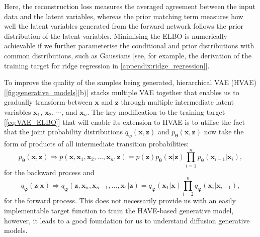 Here, the reconstruction loss measures the averaged agreement between the input data and the latent variables, whereas the prior matching term measures how well the latent variables generated from the forward network follows the prior distribution of the latent variables. Minimising the ELBO is numerically achievable if we further parameterise the conditional and prior distributions with common distributions, such as Gaussians [see, for example, the derivation of the training target for ridge regression in \cref{appendix:ridge_regression}]. 

To improve the quality of the samples being generated, hierarchical VAE (HVAE) [\cref{fig:generative_models}(b)] stacks multiple VAE together that enables us to gradually transform between $\bm{x}$ and $\bm{z}$ through multiple intermediate latent variables $\bm{x}_1$, $\bm{x}_2$, $\cdots$, and $\bm{x}_n$. The key modification to the training target [\cref{eq:VAE_ELBO}] that will enable its extension to HVAE is to utilise the fact that the joint probability distributions $q_{\boldsymbol{\varphi}}(\bm{x},\bm{z})$ and $p_{\boldsymbol{\theta}}(\bm{x},\bm{z})$ now take the form of products of all intermediate transition probabilities:
\begin{equation}
\label{eq:HVAE_backward}
    p_{\boldsymbol{\theta}}(\bm{x},\bm{z})\Rightarrow p(\bm{x},\bm{x}_1,\bm{x}_2,\ldots,\bm{x}_n,\bm{z})=p(\bm{z})p_{\boldsymbol{\theta}}(\bm{x}|\bm{z})\prod_{i=1}^{n}p_{\boldsymbol{\theta}}(\bm{x}_{i-1}|\bm{x}_i),
\end{equation}
for the backward process and
\begin{equation}
\label{eq:HVAE_forward}
    q_{\boldsymbol{\varphi}}(\bm{z}|\bm{x})\Rightarrow q_{\boldsymbol{\varphi}}(\bm{z},\bm{x}_{n},\bm{x}_{n-1},\ldots,\bm{x}_1|\bm{z})=q_{\boldsymbol{\varphi}}(\bm{x}_1|\bm{x})\prod_{i=2}^{n}q_{\boldsymbol{\varphi}}(\bm{x}_i|\bm{x}_{i-1}),
\end{equation}
for the forward process. This does not necessarily provide us with an easily implementable target function to train the HAVE-based generative model, however, it leads to a good foundation for us to understand diffusion generative models.

